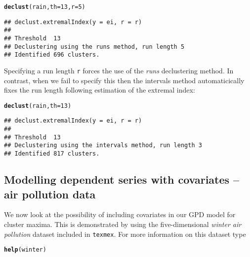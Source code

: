 \documentclass[10pt]{article}\usepackage[]{graphicx}\usepackage[]{color}
\makeatletter
\newcommand{\hlnum}[1]{\textcolor[rgb]{0.686,0.059,0.569}{#1}}%
\newcommand{\hlstd}[1]{\textcolor[rgb]{0.345,0.345,0.345}{#1}}%
\newcommand{\hlkwc}[1]{\textcolor[rgb]{0.333,0.667,0.333}{#1}}%
\newcommand{\hlkwd}[1]{\textcolor[rgb]{0.737,0.353,0.396}{\textbf{#1}}}%
\newenvironment{kframe}{%
 \def\at@end@of@kframe{}%
 \ifinner\ifhmode%
  \def\at@end@of@kframe{\end{minipage}}%
  \begin{minipage}{\columnwidth}%
 \fi\fi%
 \def\FrameCommand##1{\hskip\@totalleftmargin \hskip-\fboxsep
 \colorbox{shadecolor}{##1}\hskip-\fboxsep
     \hskip-\linewidth \hskip-\@totalleftmargin \hskip\columnwidth}%
 \MakeFramed {\advance\hsize-\width
   \@totalleftmargin\z@ \linewidth\hsize
   \@setminipage}}%
 {\par\unskip\endMakeFramed%
 \at@end@of@kframe}
\newenvironment{knitrout}{}{} %
\makeatother
\begin{document}
\begin{knitrout}
\color{fgcolor}\begin{kframe}
\begin{alltt}
\hlkwd{declust}\hlstd{(rain,}\hlkwc{th}\hlstd{=}\hlnum{13}\hlstd{,}\hlkwc{r}\hlstd{=}\hlnum{5}\hlstd{)}
\end{alltt}
\begin{verbatim}
## declust.extremalIndex(y = ei, r = r)
## 
## Threshold  13 
## Declustering using the runs method, run length 5 
## Identified 696 clusters.
\end{verbatim}
\end{kframe}
\end{knitrout}

Specifying a run length {\tt r} forces the use of the {\it runs} declustering method.  In contrast, when we fail to specify this then the intervals method automaticically fixes the run length following estimation of the extremal index:

\begin{knitrout}
\color{fgcolor}\begin{kframe}
\begin{alltt}
\hlkwd{declust}\hlstd{(rain,}\hlkwc{th}\hlstd{=}\hlnum{13}\hlstd{)}
\end{alltt}
\begin{verbatim}
## declust.extremalIndex(y = ei, r = r)
## 
## Threshold  13 
## Declustering using the intervals method, run length 3 
## Identified 817 clusters.
\end{verbatim}
\end{kframe}
\end{knitrout}
%
\subsection{Modelling dependent series with covariates  -- air pollution data}
%
We now look at the possibility of including covariates in our GPD model for cluster maxima.  This is demonstrated by using the five-dimensional {\it winter air pollution} dataset included in {\tt texmex}. For more information on this dataset type

\begin{knitrout}
\color{fgcolor}\begin{kframe}
\begin{alltt}
\hlkwd{help}\hlstd{(winter)}
\end{alltt}
\end{kframe}
\end{knitrout}
\end{document}
